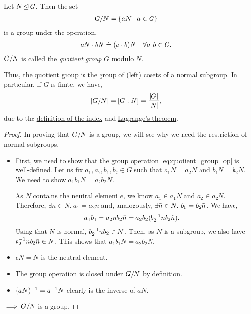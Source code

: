 \begin{thm}\label{thm:quotient_group}
Let $N \operatorname*{\trianglelefteq} G$. Then the set \begin{align}
    G/N \overset{.}{=} \{a N \mid a \in G\}
\end{align} is a group under the operation, \begin{align}
    a N \cdot b N \overset{.}{=} (a \cdot b) N \quad \forall a, b \in G. \label{eq:quotient_group_op}
\end{align} $G/N$ is called the \emph{quotient group} $G$ modulo $N$.
\end{thm} Thus, the quotient group is the group of (left) cosets of a normal subgroup. In particular, if $G$ is finite, we have, \begin{align}
    |G/N| = [G:N] = \frac{|G|}{|N|},
\end{align} due to the \hyperref[defn:index]{definition of the index} and \hyperref[thm"lagrange]{Lagrange's theorem}. \begin{proof}
In proving that $G/N$ is a group, we will see why we need the restriction of normal subgroups.

\begin{itemize}
    \item First, we need to show that the group operation \eqref{eq:quotient_group_op} is well-defined. Let us fix $a_1, a_2, b_1, b_2 \in G$ such that $a_1 N = a_2 N$ and $b_1 N = b_2 N$. We need to show $a_1 b_1 N = a_2 b_2 N$.
    
    As $N$ contains the neutral element $e$, we know $a_1 \in a_1 N$ and $a_2 \in a_2 N$. Therefore, $\exists n \in N.\ a_1 = a_2 n$ and, analogously, $\exists \Tilde{n} \in N.\ b_1 = b_2 \Tilde{n}$. We have, \begin{align*}
        a_1 b_1 = a_2 n b_2 \Tilde{n} = a_2 b_2 (b_2^{-1} n b_2 \Tilde{n}).
    \end{align*} Using that $N$ is normal, $b_2^{-1} n b_2 \in N$. Then, as $N$ is a subgroup, we also have $b_2^{-1} n b_2 \Tilde{n} \in N$. This shows that $a_1 b_1 N = a_2 b_2 N$.
    \item $e N = N$ is the neutral element.
    \item The group operation is closed under $G/N$ by definition.
    \item $(a N)^{-1} = a^{-1} N$ clearly is the inverse of $a N$.
\end{itemize} $\implies G/N$ is a group.
\end{proof}


